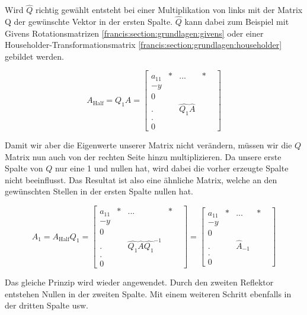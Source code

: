 Wird $\hat{Q}$ richtig gewählt entsteht bei einer Multiplikation von links mit der Matrix Q der gewünschte Vektor in der ersten Spalte.
$\hat{Q}$ kann dabei zum Beispiel mit Givens Rotationsmatrizen \ref{francis:section:grundlagen:givens} oder einer Householder-Transformationsmatrix \ref{francis:section:grundlagen:householder} gebildet werden.

\begin{equation}
	A_{\text{Half}}=Q_{1}A=
	\begin{bmatrix}
	a_{11} & * & ... & *\\
	-y & \\
	0 & & & &\\
	. & &\hat{Q_1}\hat{A} & &\\
	. & & & &\\
	0 & & & &
	\end{bmatrix}
\end{equation}

Damit wir aber die Eigenwerte unserer Matrix nicht verändern, müssen wir die $Q$ Matrix nun auch von der rechten Seite hinzu multiplizieren.
Da unsere erste Spalte von $Q$ nur eine 1 und nullen hat, wird dabei die vorher erzeugte Spalte nicht beeinflusst.
Das Resultat ist also eine ähnliche Matrix, welche an den gewünschten Stellen in der ersten Spalte nullen hat.

\begin{equation}
	A_{1}=A_{\text{Half}}Q_{1}=
	\begin{bmatrix}
	a_{11} & * & ... & *\\
	-y & \\
	0 & & & &\\
	. & &\hat{Q_1}\hat{A}\hat{Q_1}^{-1} & &\\
	. & & & &\\
	0 & & & &
	\end{bmatrix}
	=
	\begin{bmatrix}
	a_{11} & * & ... & *\\
	-y & \\
	0 & & & &\\
	. & &\hat{A}_{-1} & &\\
	. & & & &\\
	0 & & & &
	\end{bmatrix}
\end{equation}	

Das gleiche Prinzip wird wieder angewendet.
Durch den zweiten Reflektor entstehen Nullen in der zweiten Spalte.
Mit einem weiteren Schritt ebenfalls in der dritten Spalte usw.

